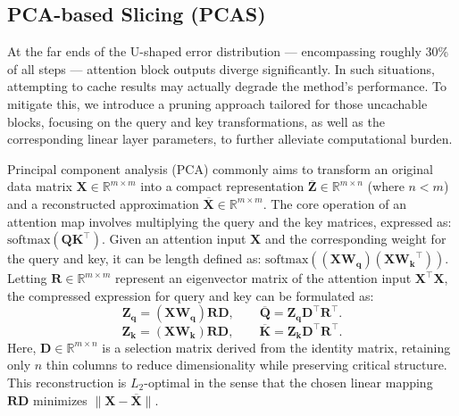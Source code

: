 \subsection{PCA-based Slicing (PCAS)}
\label{chap:PCAS}
At the far ends of the U-shaped error distribution — encompassing roughly 30\% of all steps — attention block outputs diverge significantly. In such situations, attempting to cache results may actually degrade the method’s performance. To mitigate this, we introduce a pruning approach tailored for those uncachable blocks, focusing on the query and key transformations, as well as the corresponding linear layer parameters, to further alleviate computational burden.

Principal component analysis (PCA) commonly aims to transform an original data matrix \(\mathbf{X} \in \mathbb{R}^{m \times m}\) into a compact representation \(\mathbf{\overline{Z}} \in \mathbb{R}^{m \times n}\) (where \(n < m\)) and a reconstructed approximation \(\overline{\mathbf{X}} \in \mathbb{R}^{m \times m}\). The core operation of an attention map involves multiplying the query and the key matrices, expressed as: $\text{softmax}(\mathbf{Q}\mathbf{K}^{\top})$. Given an attention input $\mathbf{X}$ and the corresponding weight for the query and key, it can be length defined as: $\text{softmax}((\mathbf{XW_{q}})(\mathbf{XW_{k}}^{\top}))$. Letting \(\mathbf{R} \in \mathbb{R}^{m \times m}\) represent an eigenvector matrix of the attention input \(\mathbf{X}^{\top}\mathbf{X}\), the compressed expression for query and key can be formulated as:
\begin{equation}
        \mathbf{Z_{q}} = \mathbf{(XW_{q})RD}, \quad \quad \overline{\mathbf{Q}} = \mathbf{Z_{q} D}^{\top}\mathbf{R}^{\top}.
\end{equation}
\begin{equation}
        \mathbf{Z_{k}} = \mathbf{(XW_{k})RD}, \quad \quad \overline{\mathbf{K}} = \mathbf{Z_{k} D}^{\top}\mathbf{R}^{\top}.
\end{equation}
Here, \(\mathbf{D} \in \mathbb{R}^{m \times n}\) is a selection matrix derived from the identity matrix, retaining only \(n\) thin columns to reduce dimensionality while preserving critical structure. This reconstruction is \(L_2\)-optimal in the sense that the chosen linear mapping $\mathbf{RD}$ minimizes \(\|\mathbf{X} - \overline{\mathbf{X}}\|\). 




 




